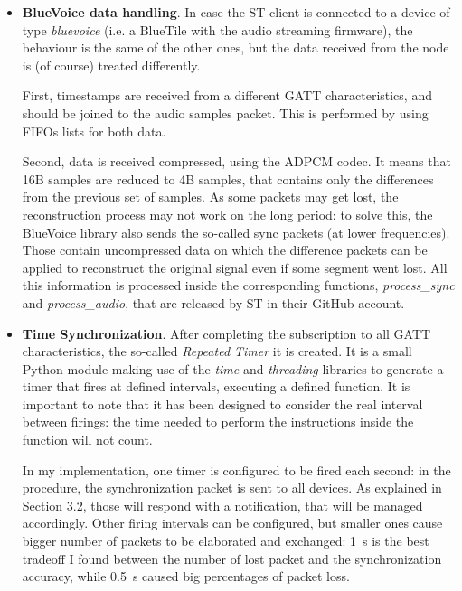 \begin{itemize}
    It is important to add that the BluePy library makes use of the \\\textit{wait\_for\_notification} blocking function, that waits for notification from the precise device it is called from. As we are dealing with more than one device, it is necessary to create different threads, one per node, and then call the function in them using a while condition. As soon as the while condition becomes false, the thread will terminate. 

    \item \textbf{BlueVoice data handling}. In case the ST client is connected to a device of type \textit{bluevoice} (i.e. a BlueTile with the audio streaming firmware), the behaviour is the same of the other ones, but the data received from the node is (of course) treated differently. 
    
    First, timestamps are received from a different GATT characteristics, and should be joined to the audio samples packet. This is performed by using FIFOs lists for both data. 

    Second, data is received compressed, using the ADPCM codec. It means that 16B samples are reduced to 4B samples, that contains only the differences from the previous set of samples. As some packets may get lost, the reconstruction process may not work on the long period: to solve this, the BlueVoice library also sends the so-called sync packets (at lower frequencies). Those contain uncompressed data on which the difference packets can be applied to reconstruct the original signal even if some segment went lost. 
    All this information is processed inside the corresponding functions, \textit{process\_sync} and \textit{process\_audio}, that are released by ST in their GitHub account. 

    \item \textbf{Time Synchronization}. After completing the subscription to all GATT characteristics, the so-called \textit{Repeated Timer} it is created. It is a small Python module making use of the \textit{time} and \textit{threading} libraries to generate a timer that fires at defined intervals, executing a defined function. It is important to note that it has been designed to consider the real interval between firings: the time needed to perform the instructions inside the function will not count. 

    In my implementation, one timer is configured to be fired each second: in the procedure, the synchronization packet is sent to all devices. As explained in Section 3.2, those will respond with a notification, that will be managed accordingly. Other firing intervals can be configured, but smaller ones cause bigger number of packets to be elaborated and exchanged: 1~s is the best tradeoff I found between the number of lost packet and the synchronization accuracy, while 0.5~s caused big percentages of packet loss. 


\end{itemize}
